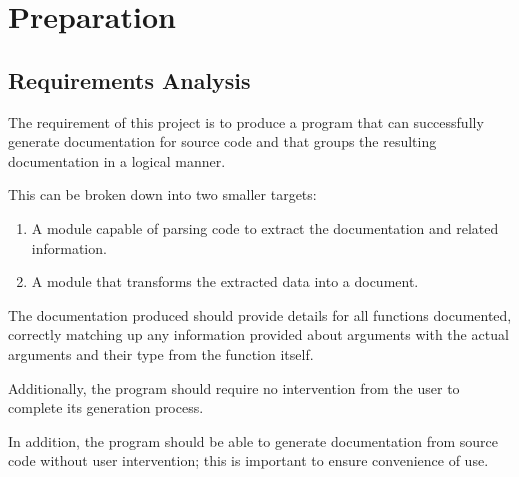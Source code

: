 



\chapter{Preparation}
\section{Requirements Analysis}

The requirement of this project is to produce a program that can successfully
generate documentation for source code and that groups the resulting
documentation in a logical manner.

This can be broken down into two smaller targets:
\begin{enumerate}
  \item A module capable of parsing code to extract the documentation and
    related information.
  \item A module that transforms the extracted data into a document.
\end{enumerate}

The documentation produced should provide details for all functions documented,
correctly matching up any information provided about arguments with the actual
arguments and their type from the function itself.

Additionally, the program should require no intervention from the user to
complete its generation process.

In addition, the program should be able to generate documentation from source
code without user intervention; this is important to ensure convenience of use.


